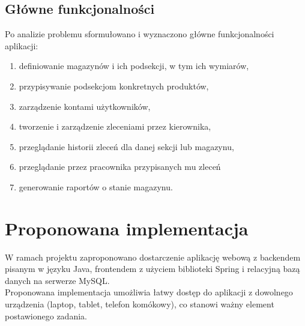 \documentclass[]{article}
\begin{document}
    \subsection{Główne funkcjonalności}
    Po analizie problemu sformułowano i wyznaczono główne funkcjonalności aplikacji:
    \begin{enumerate}
        \item definiowanie magazynów i ich podsekcji, w tym ich wymiarów,
        \item przypisywanie podsekcjom konkretnych produktów,
        \item zarządzenie kontami użytkowników,
        \item tworzenie i zarządzenie zleceniami przez kierownika,
        \item przeglądanie historii zleceń dla danej sekcji lub magazynu,
        \item przeglądanie przez pracownika przypisanych mu zleceń
        \item generowanie raportów o stanie magazynu.
    \end{enumerate}

    \section{Proponowana implementacja}
    W ramach projektu zaproponowano dostarczenie aplikację webową z backendem pisanym w języku Java, frontendem z użyciem biblioteki Spring i relacyjną bazą danych na serwerze MySQL. \\
    Proponowana implementacja umożliwia łatwy dostęp do aplikacji z dowolnego urządzenia (laptop, tablet, telefon komókowy), co stanowi ważny element postawionego zadania.
\end{document}
